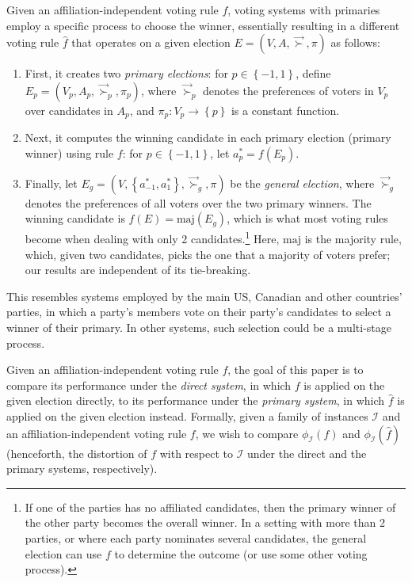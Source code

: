 \documentclass[letterpaper]{article} %
\theoremstyle{definition}
\newcommand{\set}[1]{\left\{#1\right\}}
\renewcommand{\vec}{\overrightarrow}
\renewcommand{\hat}{\widehat}
\newcommand{\calI}{\mathcal{I}}
\newcommand{\vsucc}{\vec{\succ}}
\newcommand{\pleft}{-1}
\newcommand{\pright}{1}
\newcommand{\maj}{\textrm{maj}}
\begin{document}
Given an affiliation-independent voting rule $f$, voting systems with primaries employ a specific process to choose the winner, essentially resulting in a different voting rule $\hat{f}$ that operates on a given election $E = (V,A,\vsucc,\pi)$ as follows:
\begin{enumerate}
	\item First, it creates two \emph{primary elections}: for $p \in \set{\pleft,\pright}$, define $E_p = (V_p,A_p,\vsucc_p,\pi_p)$, where $\vsucc_p$ denotes the preferences of voters in $V_p$ over candidates in $A_p$, and $\pi_p : V_p \to \set{p}$ is a constant function. 
	\item Next, it computes the winning candidate in each primary election (primary winner) using rule $f$: for $p \in \set{\pleft,\pright}$, let $a^*_p = f(E_p)$.
	\item Finally, let $E_g = (V,\set{a^*_{\pleft},a^*_{\pright}},\vsucc_g,\pi)$ be the \emph{general election}, where $\vsucc_g$ denotes the preferences of all voters over the two primary winners. The winning candidate is $\hat{f}(E) = \maj(E_g)$, which is what most voting rules become when dealing with only 2 candidates.\footnote{If one of the parties has no affiliated candidates, then the primary winner of the other party becomes the overall winner. In a setting with more than 2 parties, or where each party nominates several candidates, the general election can use $f$ to determine the outcome (or use some other voting process).} Here, $\maj$ is the majority rule, which, given two candidates, picks the one that a majority of voters prefer; our results are independent of its tie-breaking. 
\end{enumerate}
This resembles systems employed by the main US, Canadian and other countries' parties, in which a party's members vote on their party's candidates to select a winner of their primary. In other systems, such selection could be a multi-stage process.

Given an affiliation-independent voting rule $f$, the goal of this paper is to compare its performance under the \emph{direct system}, in which $f$ is applied on the given election directly, to its performance under the \emph{primary system}, in which $\hat{f}$ is applied on the given election instead. Formally, given a family of instances $\calI$ and an affiliation-independent voting rule $f$, we wish to compare $\phi_{\calI}(f)$ and $\phi_{\calI}(\hat{f})$ (henceforth, the distortion of $f$ with respect to $\calI$ under the direct and the primary systems, respectively). 
\end{document}
